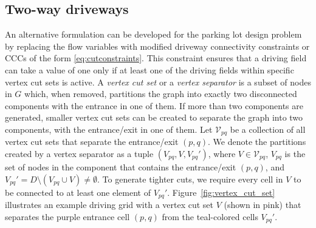 \documentclass[10pt]{article}
\newcommand{\validdriveset}{D}
\newcommand{\grid}{G}
\newcommand{\entrancex}{p}
\newcommand{\entrancey}{q}
\newcommand{\vertexpartitions}[1]{\mathcal{V}_{#1}}
\newcommand{\vertexcutset}{V}
\newcommand{\twowaypartition}[1]{V_{#1}}
\newcommand{\twowaypartitioncomp}[1]{V_{#1}'}
\theoremstyle{definition}
\begin{document}
\subsection{Two-way driveways}
\label{sec:two-way-branch-and-cut}
An alternative formulation can be developed for the parking lot design problem by replacing the flow variables with modified driveway connectivity constraints or CCCs of the form \eqref{eq:cutconstraints}. This constraint ensures that a driving field can take a value of one only if at least one of the driving fields within specific vertex cut sets is active. A \textit{vertex cut set} or a \textit{vertex separator} is a subset of nodes in $\grid$ which, when removed, partitions the graph into exactly two disconnected components with the entrance in one of them. If more than two components are generated, smaller vertex cut sets can be created to separate the graph into two components, with the entrance/exit in one of them. Let $\vertexpartitions{pq}$ be a collection of all vertex cut sets that separate the entrance/exit $(\entrancex, \entrancey)$. We denote the partitions created by a vertex separator as a tuple $(\twowaypartition{\entrancex \entrancey}, \vertexcutset, \twowaypartitioncomp{\entrancex \entrancey})$, where $\vertexcutset \in \vertexpartitions{pq}$, $\twowaypartition{\entrancex \entrancey}$ is the set of nodes in the component that contains the entrance/exit $(\entrancex, \entrancey)$, and $\twowaypartitioncomp{\entrancex \entrancey} = \validdriveset \setminus (\twowaypartition{\entrancex \entrancey} \cup \vertexcutset) \neq \emptyset$. To generate tighter cuts, we require every cell in $V$ to be connected to at least one element of $\twowaypartitioncomp{\entrancex \entrancey}$. Figure~\ref{fig:vertex_cut_set} illustrates an example driving grid with a vertex cut set $\vertexcutset$ (shown in pink) that separates the purple entrance cell $(p, q)$ from the teal-colored cells $\twowaypartitioncomp{\entrancex \entrancey}$.
\end{document}
